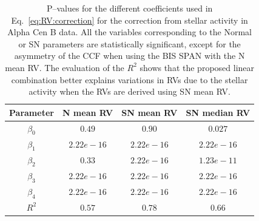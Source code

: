 \documentclass{aa}
\begin{document}
\begin{table}
\begin{center}
\caption{P--values for the different coefficients used in Eq.~\ref{eq:RV:correction} for the correction from stellar activity in Alpha Cen B data. All the variables corresponding to the Normal or SN parameters are statistically significant, except for the asymmetry of the CCF when using the BIS SPAN with the N mean RV.
The evaluation of the $R^2$ shows that the proposed linear combination better explains variations in RVs due to the stellar activity when the RVs are derived using SN mean RV.}
\label{table:alphacent.test}
\begin{tabular}{|c|c|c|c|}
\hline
Parameter          & N mean RV         &   SN mean RV &   SN median RV \\
\hline
$\beta_{0}$            &    $0.49$    & $0.90 $  & $0.027$ \\
\hline
$\beta_{1}$            &    $2.22e-16$    & $2.22e-16 $  & $2.22e-16$ \\
\hline
$\beta_{2}$            &     $0.33$   & $2.22e-16 $ & $1.23e-11$\\
\hline
$\beta_{3}$            &     $ 2.22e-16$   &  $2.22e-16 $  & $ 2.22e-16$\\
\hline
$\beta_{4}$            &     $2.22e-16$   &  $2.22e-16 $ & $ 2.22e-16 $\\
\hline
$R^{2}$      &     $0.57$    &  $0.78$ & $0.66$  \\
\hline
\end{tabular}
\end{center}
\end{table}

\end{document}
